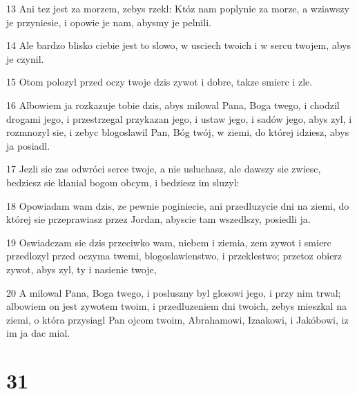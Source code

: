 \par 13 Ani tez jest za morzem, zebys rzekl: Któz nam poplynie za morze, a wziawszy je przyniesie, i opowie je nam, abysmy je pelnili.
\par 14 Ale bardzo blisko ciebie jest to slowo, w usciech twoich i w sercu twojem, abys je czynil.
\par 15 Otom polozyl przed oczy twoje dzis zywot i dobre, takze smierc i zle.
\par 16 Albowiem ja rozkazuje tobie dzis, abys milowal Pana, Boga twego, i chodzil drogami jego, i przestrzegal przykazan jego, i ustaw jego, i sadów jego, abys zyl, i rozmnozyl sie, i zebyc blogoslawil Pan, Bóg twój, w ziemi, do której idziesz, abys ja posiadl.
\par 17 Jezli sie zas odwróci serce twoje, a nie usluchasz, ale dawszy sie zwiesc, bedziesz sie klanial bogom obcym, i bedziesz im sluzyl:
\par 18 Opowiadam wam dzis, ze pewnie poginiecie, ani przedluzycie dni na ziemi, do której sie przeprawiasz przez Jordan, abyscie tam wszedlszy, posiedli ja.
\par 19 Oswiadczam sie dzis przeciwko wam, niebem i ziemia, zem zywot i smierc przedlozyl przed oczyma twemi, blogoslawienstwo, i przeklestwo; przetoz obierz zywot, abys zyl, ty i nasienie twoje,
\par 20 A milowal Pana, Boga twego, i posluszny byl glosowi jego, i przy nim trwal; albowiem on jest zywotem twoim, i przedluzeniem dni twoich, zebys mieszkal na ziemi, o która przysiagl Pan ojcom twoim, Abrahamowi, Izaakowi, i Jakóbowi, iz im ja dac mial.

\chapter{31}


